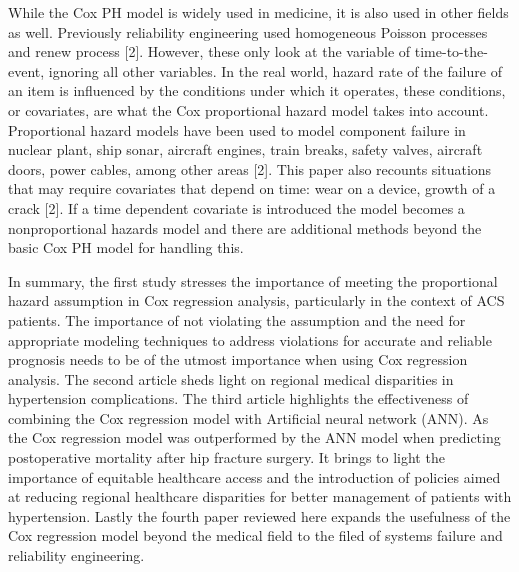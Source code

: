 \documentclass[
  letterpaper,
  DIV=11,
  numbers=noendperiod]{scrreprt}
\begin{document}
While the Cox PH model is widely used in medicine, it is also used in
other fields as well. Previously reliability engineering used
homogeneous Poisson processes and renew process {[}2{]}. However, these
only look at the variable of time-to-the-event, ignoring all other
variables. In the real world, hazard rate of the failure of an item is
influenced by the conditions under which it operates, these conditions,
or covariates, are what the Cox proportional hazard model takes into
account. Proportional hazard models have been used to model component
failure in nuclear plant, ship sonar, aircraft engines, train breaks,
safety valves, aircraft doors, power cables, among other areas {[}2{]}.
This paper also recounts situations that may require covariates that
depend on time: wear on a device, growth of a crack {[}2{]}. If a time
dependent covariate is introduced the model becomes a nonproportional
hazards model and there are additional methods beyond the basic Cox PH
model for handling this.

In summary, the first study stresses the importance of meeting the
proportional hazard assumption in Cox regression analysis, particularly
in the context of ACS patients. The importance of not violating the
assumption and the need for appropriate modeling techniques to address
violations for accurate and reliable prognosis needs to be of the utmost
importance when using Cox regression analysis. The second article sheds
light on regional medical disparities in hypertension complications. The
third article highlights the effectiveness of combining the Cox
regression model with Artificial neural network (ANN). As the Cox
regression model was outperformed by the ANN model when predicting
postoperative mortality after hip fracture surgery. It brings to light
the importance of equitable healthcare access and the introduction of
policies aimed at reducing regional healthcare disparities for better
management of patients with hypertension. Lastly the fourth paper
reviewed here expands the usefulness of the Cox regression model beyond
the medical field to the filed of systems failure and reliability
engineering.
\end{document}
